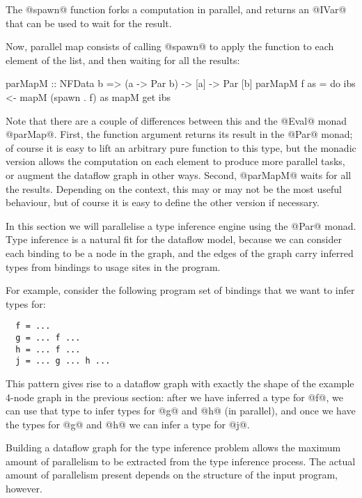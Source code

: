 \noindent The @spawn@ function forks a computation in parallel, and
returns an @IVar@ that can be used to wait for the result.

Now, parallel map consists of calling @spawn@ to apply the function to
each element of the list, and then waiting for all the results:

\begin{haskell}
parMapM :: NFData b => (a -> Par b) -> [a] -> Par [b]
parMapM f as = do
  ibs <- mapM (spawn . f) as
  mapM get ibs
\end{haskell}

\noindent Note that there are a couple of differences between this and
the @Eval@ monad @parMap@.  First, the function argument returns its
result in the @Par@ monad; of course it is easy to lift an arbitrary
pure function to this type, but the monadic version allows the
computation on each element to produce more parallel tasks, or augment
the dataflow graph in other ways.  Second, @parMapM@ waits for all the
results.  Depending on the context, this may or may not be the most
useful behaviour, but of course it is easy to define the other version
if necessary.


In this section we will parallelise a type inference engine using the
@Par@ monad.  Type inference is a natural fit for the dataflow model,
because we can consider each binding to be a node in the graph, and
the edges of the graph carry inferred types from bindings to usage
sites in the program.

For example, consider the following program set of bindings that we
want to infer types for:

{\small \begin{verbatim}
  f = ...
  g = ... f ...
  h = ... f ...
  j = ... g ... h ...
\end{verbatim}}

This pattern gives rise to a dataflow graph with exactly the shape of
the example 4-node graph in the previous section: after we have
inferred a type for @f@, we can use that type to infer types for @g@
and @h@ (in parallel), and once we have the types for @g@ and @h@ we
can infer a type for @j@.

Building a dataflow graph for the type inference problem allows the
maximum amount of parallelism to be extracted from the type inference
process.  The actual amount of parallelism present depends on the
structure of the input program, however.

